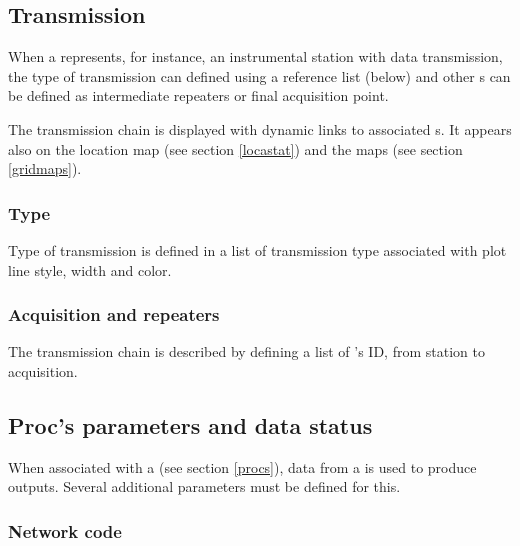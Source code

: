 \subsection{Transmission}

When a  represents, for instance, an instrumental station with data transmission, the type of transmission can defined using a reference list (below) and other s can be defined as intermediate repeaters or final acquisition point.

The transmission chain is displayed with dynamic links to associated s. It appears also on the location map (see section \ref{locastat}) and the  maps (see section \ref{gridmaps}).

\subsubsection{Type}

Type of transmission is defined in a list of transmission type associated with plot line style, width and color.




\subsubsection{Acquisition and repeaters}

The transmission chain is described by defining a list of 's ID, from station to acquisition.


\subsection{Proc's parameters and data status}

When associated with a  (see section \ref{procs}), data from a  is used to produce outputs. Several additional parameters must be defined for this.


\subsubsection{Network code}


